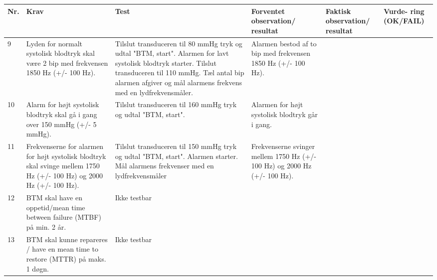 \begin{table}[H]
\begin{tabular}{|p{0.5cm}|p{4cm}|p{3cm}|p{3cm}|p{3cm}|p{1cm}|}
\hline
\textbf{Nr.} & \textbf{Krav} & \textbf{Test}& \textbf{Forventet observation/ resultat}& \textbf{Faktisk observation/ resultat}& \textbf{Vurde- ring (OK/FAIL)}\\\hline
 9 & Lyden for normalt systolisk blodtryk skal være 2 bip med frekvensen 1850 Hz (+/- 100 Hz). & Tilslut transduceren til 80 mmHg tryk og udtal "BTM, start". Alarmen for lavt systolisk blodtryk starter. Tilslut transduceren til 110 mmHg. Tæl antal bip alarmen afgiver og mål alarmens frekvens med en lydfrekvensmåler. & Alarmen bestod af to bip med frekvensen 1850 Hz (+/- 100 Hz). & & \\\hline
 10 & Alarm for højt systolisk blodtryk skal gå i gang over 150 mmHg (+/- 5 mmHg). & Tilslut transduceren til 160 mmHg tryk og udtal "BTM, start". & Alarmen for højt systolisk blodtryk går i gang. & & \\\hline
 11 & Frekvenserne for alarmen for højt systolisk blodtryk skal svinge mellem 1750 Hz (+/- 100 Hz) og 2000 Hz (+/- 100 Hz). & Tilslut transduceren til 150 mmHg tryk og udtal "BTM, start". Alarmen starter. Mål alarmens frekvenser med en lydfrekvensmåler & Frekvenserne svinger mellem 1750 Hz (+/- 100 Hz) og 2000 Hz (+/- 100 Hz). & & \\\hline
 12 & BTM skal have en oppetid/mean time between failure (MTBF) på min. 2 år. & Ikke testbar & & & \\\hline
 13 & BTM skal kunne repareres / have en mean time to restore (MTTR) på maks. 1 døgn. & Ikke testbar & & & \\\hline
\end{tabular}
\end{table}
\newpage
